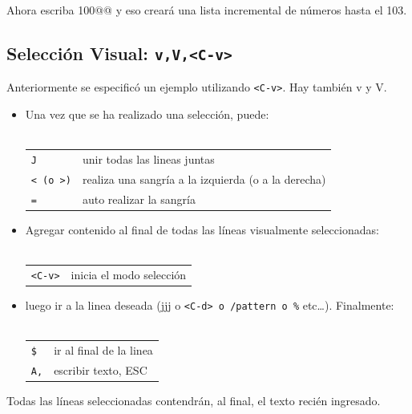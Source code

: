 \documentclass[12pt]{article}
\begin{document}
Ahora escriba 100@@ y eso creará una lista incremental de números hasta el 103.



\subsection{Selección Visual: \texttt{v,V,<C-v>}}


Anteriormente se especificó un ejemplo utilizando \texttt{<C-v>}.
Hay también v y V. 


\begin{itemize}
	\item Una vez que se ha realizado una selección, puede: \\ \\
\begin{tabular}{ l l }
	\texttt{J} & unir todas las lineas juntas \\
	\texttt{< (o >)} & realiza una sangría a la izquierda (o a la derecha) \\
	\texttt{=} & auto realizar la sangría \\
\end{tabular}
\end{itemize}





\begin{itemize}
	\item Agregar contenido al final de todas las líneas visualmente seleccionadas: \\ \\
\begin{tabular}{ l l }
	\texttt{<C-v>} & inicia el modo selección \\
\end{tabular}
\end{itemize}
\begin{itemize}
    \item luego ir a la linea deseada (jjj o \texttt{<C-d> o /pattern o \%} etc…). Finalmente: \\ \\
\begin{tabular}{ l l }
	\texttt{\$} & ir al final de la linea \\
	\texttt{A,} & escribir texto, ESC \\
\end{tabular}
\end{itemize}

Todas las líneas seleccionadas contendrán, al final, el texto recién ingresado.
\end{document}
